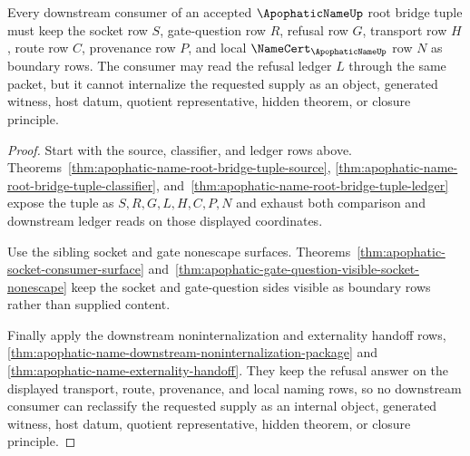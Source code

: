 \begin{theorem}
\label{thm:apophatic-name-root-bridge-tuple-noninternalization}
Every downstream consumer of an accepted $\ApophaticNameUp$ root bridge tuple must keep the socket row $S$, gate-question row $R$, refusal row $G$, transport row $H$, route row $C$, provenance row $P$, and local $\NameCert_{\ApophaticNameUp}$ row $N$ as boundary rows. The consumer may read the refusal ledger $L$ through the same packet, but it cannot internalize the requested supply as an object, generated witness, host datum, quotient representative, hidden theorem, or closure principle.
\end{theorem}
\begin{proof}
Start with the source, classifier, and ledger rows above. Theorems~\ref{thm:apophatic-name-root-bridge-tuple-source}, \ref{thm:apophatic-name-root-bridge-tuple-classifier}, and~\ref{thm:apophatic-name-root-bridge-tuple-ledger} expose the tuple as $S,R,G,L,H,C,P,N$ and exhaust both comparison and downstream ledger reads on those displayed coordinates.

Use the sibling socket and gate nonescape surfaces. Theorems~\ref{thm:apophatic-socket-consumer-surface} and~\ref{thm:apophatic-gate-question-visible-socket-nonescape} keep the socket and gate-question sides visible as boundary rows rather than supplied content.

Finally apply the downstream noninternalization and externality handoff rows, \autoref{thm:apophatic-name-downstream-noninternalization-package} and \autoref{thm:apophatic-name-externality-handoff}. They keep the refusal answer on the displayed transport, route, provenance, and local naming rows, so no downstream consumer can reclassify the requested supply as an internal object, generated witness, host datum, quotient representative, hidden theorem, or closure principle.
\end{proof}

